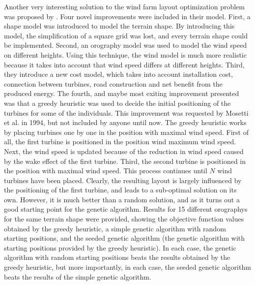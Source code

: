 \noindent Another very interesting solution to the wind farm layout optimization problem was proposed by \cite{Saavedra-Morena}. Four novel improvements were included in their model. First, a shape model was introduced to model the terrain shape. By introducing this model, the simplification of a square grid was lost, and every terrain shape could be implemented. Second, an orography model was used to model the wind speed on different heights. Using this technique, the wind model is much more realistic because it takes into account that wind speed differs at different heights. Third, they introduce a new cost model, which takes into account installation cost, connection between turbines, road construction and net benefit from the produced energy. The fourth, and maybe most exiting improvement presented  was that a greedy heuristic was used to decide the initial positioning of the turbines for some of the individuals. This improvement was requested by Mosetti et al. in 1994, but not included by anyone until now. The greedy heuristic works by placing turbines one by one in the position with maximal wind speed. First of all, the first turbine is positioned in the position wind maximum wind speed. Next, the wind speed is updated because of the reduction in wind speed caused by the wake effect of the first turbine. Third, the second turbine is positioned in the position with maximal wind speed. This process continues until $N$ wind turbines have been placed. Clearly, the resulting layout is largely influenced by the positioning of the first turbine, and leads to a sub-optimal solution on its own. However, it is much better than a random solution, and as it turns out a good starting point for the genetic algorithm. Results for 15 different orographys for the same terrain shape were provided, showing the objective function values obtained by the greedy heuristic, a simple genetic algorithm with random starting positions, and the seeded genetic algorithm (the genetic algorithm with starting positions provided by the greedy heuristic). In each case, the genetic algorithm with random starting positions beats the results obtained by the greedy heuristic, but more importantly, in each case, the seeded genetic algorithm beats the results of the simple genetic algorithm. \\


